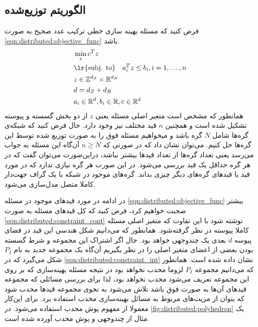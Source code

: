 \subsection{الگوریتم توزیع‌شده}
فرض کنید که مسئله بهینه سازی خطی ترکیب عدد صحیح به صورت \cref{eqn:distributed:objective_func} باشد.
\begin{subequations}\label{eqn:distributed:objective_func}
	\begin{align}
		&\min_{z}c^Tz  \\
		&\text{\lr{subj. to}} \quad a_i^Tz \le b_i, i = 1, \dots, n  \\
		&z \in \mathbb{Z}^{d_Z} \times \mathbb{R}^{d_R} \\
		&d = d_Z + d_R  \\
		&a_i \in \mathbb{R}^d , b_i \in \mathbb{R}, c \in \mathbb{R}^d
	\end{align}
\end{subequations}
	همانطور که مشخص است متغیر اصلی مسئله یعنی $z$ از دو بخش گسسته و پیوسته تشکیل شده است و همچنین $n$ قید مختلف نیز وجود دارد. حال فرض کنید که شبکه‌ی گره‌ها شامل $N$ گره باشد و میخواهیم مسئله فوق را به صورت توزیع شده توسط این گره‌ها حل کنیم. می‌توان نشان داد که در صورتی که $n \ge N$ آن‌گاه این مسئله به جواب می‌رسد یعنی تعداد گره‌ها از تعداد قیدها بیشتر نباشد، دراین‌صورت می‌توان گفت که در هر گره حداقل یک قید بررسی می‌شود. در این صورت هر گره نیازی ندارد که در مورد قید یا قیدهای گره‌های دیگر چیزی بداند.
	گره‌های موجود در شبکه با یک گراف جهت‌دار کاملا متصل مدل‌سازی می‌شود. 
	
	در ادامه در مورد قیدهای موجود در مسئله \cref{eqn:distributed:objective_func} بیشتر صحبت خواهیم کرد، فرض کنید که کل قیدهای مسئله به صورت \cref{eqn:distributed:constraint_cont} نوشته شود با این تفاوت که متغیر اصلی مسئله کاملا پیوسته در نظر گرفته‌شود. همانطور که می‌دانیم شکل هندسی این قید در فضای پیوسه $d$ بعدی یک چندوجهی خواهد بود. حال اگر اشتراک این مجموعه و شرط گسسته بودن بعضی از اعضای متغیر اصلی را در نظر بگیریم آن‌گاه یک مجموعه جدید به نام $P_I$ شکل می‌گیرد که در \cref{eqn:distributed:constraint_int} نشان داده شده است. همانطور که می‌دانیم مجموعه $P_I$ لزوما محدب نخواهد بود در نتیجه مسئله بهینه‌سازی که بر روی این مجموعه تعریف می‌شود محدب نخواهد بود، لذا برای بررسی مسائلی که مجموعه قیدهای آن‌ها به صورت فوق باشد تلاش می‌شود به نجوی مجموعه قیدها محدب شود که بتوان از مزیت‌های مربوط به مسائل بهینه‌سازی محدب استفاده برد. برای این‌کار معمولا از مفهوم پوش محدب استفاده می‌شود. در \cref{fig:distributed:polyhedron} یک مثال از چندوجهی و پوش محدب آورده شده است. 
	
